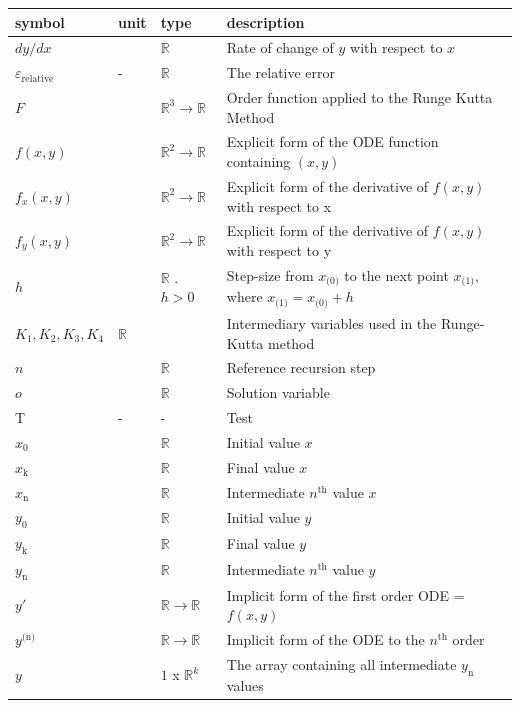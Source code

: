 \documentclass[12pt, titlepage]{article}
\begin{document}
\renewcommand{\arraystretch}{1.2}
\noindent \begin{longtable*}{l l l p{8cm}} \toprule
\textbf{symbol} & \textbf{unit} & \textbf{type} & \textbf{description}\\
\midrule
$dy/dx$ & \text {-} & $\mathbb{R}$ & Rate of change of $y$ with respect to $x$\\
$\varepsilon_\text{relative}$ & - & $\mathbb{R}$ & The relative error\\
$F$ & \text{-} & $\mathbb{R}^3 \rightarrow \mathbb{R}$ & Order function applied to the Runge Kutta Method\\
$f(x, y)$ & \text{-} & $\mathbb{R}^2 \rightarrow \mathbb{R}$& Explicit form of the ODE function containing $(x,y)$\\
$f_{x}(x, y)$ & \text{-} & $\mathbb{R}^2 \rightarrow \mathbb{R}$ & Explicit form of the derivative of $f(x, y)$ with respect to x\\
$f_{y}(x, y)$ & \text{-} & $\mathbb{R}^2 \rightarrow \mathbb{R}$ & Explicit form of the derivative of $f(x, y)$ with respect to y\\
$h$ & \text{-} & $\mathbb{R}$ . $h > 0$ & Step-size from $x_\text{(0)}$ to the next point $x_\text{(1)}$, where $x_\text{(1)} = x_\text{(0)} + h$\\
$K_1, K_2, K_3, K_4$ & $\mathbb{R}$ & \text{-} & Intermediary variables used in the Runge-Kutta method\\
$n$ & \text{-} & $\mathbb{R}$ & Reference recursion step\\
$o$ & \text{-} & $\mathbb{R}$  & Solution variable\\
T & - & - & Test\\
$x_\text{0}$ & \text{-} & $\mathbb{R}$  & Initial value $x$\\
$x_\text{k}$ & \text{-} & $\mathbb{R}$  & Final value $x$\\
$x_\text{n}$ & \text{-} & $\mathbb{R}$ & Intermediate $n^\text{th}$ value $x$\\
$y_\text{0}$ & \text{-} & $\mathbb{R}$ & Initial value $y$\\ 
$y_\text{k}$ & \text{-} & $\mathbb{R}$  & Final value $y$\\
$y_\text{n}$ & \text{-} &$\mathbb{R}$ & Intermediate $n^\text{th}$ value $y$\\ 
$y'$ & \text{-} &$\mathbb{R} \rightarrow \mathbb{R}$& Implicit form of the first order ODE = $f(x, y)$\\
$y^\text{(n)}$ & \text{-} &$\mathbb{R} \rightarrow \mathbb{R}$& Implicit form of the ODE to the $n^\text{th}$ order\\
$y$ & \text{-} & $1$ x $\mathbb{R}^k$ & The array containing all intermediate $y_\text{n}$ values\\
\bottomrule
\end{longtable*}
\end{document}
